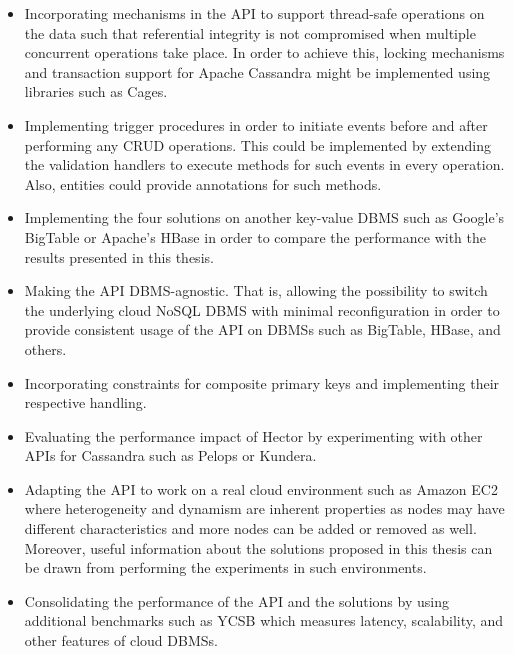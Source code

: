 \begin{itemize}
  \item Incorporating mechanisms in the \ac{API} to support thread-safe operations
  on the data such that referential integrity is not compromised when multiple
  concurrent operations take place. In order to achieve this, locking mechanisms
  and transaction support for Apache Cassandra might be implemented using
  libraries such as Cages.
  
  \item Implementing trigger procedures in order to initiate events before and
  after performing any \ac{CRUD} operations. This could be implemented by
  extending the validation handlers to execute methods for such events in every
  operation. Also, entities could provide annotations for such methods.
  
  \item Implementing the four solutions on another key-value \ac{DBMS} such as
  Google's BigTable or Apache's HBase in order to compare the performance with 
  the results presented in this thesis. 
  
  \item Making the \ac{API} \ac{DBMS}-agnostic. That is, allowing the
  possibility to switch the underlying cloud NoSQL \ac{DBMS} with minimal
  reconfiguration in order to provide consistent usage of the \ac{API} on
  \acp{DBMS} such as BigTable, HBase, and others.
  
  \item Incorporating constraints for composite primary keys and implementing
  their respective handling.
  
  
  \item Evaluating the performance impact of Hector by experimenting with other
  \acp{API} for Cassandra such as Pelops or Kundera.
  
  
  \item Adapting the \ac{API} to work on a real cloud environment such as Amazon
  EC2 where heterogeneity and  dynamism  are inherent properties as nodes may
  have different characteristics and more nodes can be added or
  removed as well.
  Moreover, useful information about the solutions proposed in this thesis 
  can be drawn from performing the experiments in such environments.
  
  \item Consolidating the performance of the \ac{API} and the solutions 
  by using additional benchmarks such as \ac{YCSB} which measures latency,
  scalability, and other features of cloud \acp{DBMS}.
 
\end{itemize}


